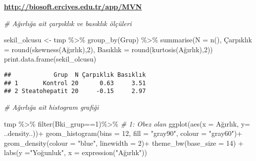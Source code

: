 \documentclass[
]{article}
\newenvironment{Shaded}{\begin{snugshade}}{\end{snugshade}}
\newcommand{\AttributeTok}[1]{\textcolor[rgb]{0.77,0.63,0.00}{#1}}
\newcommand{\CommentTok}[1]{\textcolor[rgb]{0.56,0.35,0.01}{\textit{#1}}}
\newcommand{\DecValTok}[1]{\textcolor[rgb]{0.00,0.00,0.81}{#1}}
\newcommand{\FunctionTok}[1]{\textcolor[rgb]{0.00,0.00,0.00}{#1}}
\newcommand{\NormalTok}[1]{#1}
\newcommand{\OtherTok}[1]{\textcolor[rgb]{0.56,0.35,0.01}{#1}}
\newcommand{\SpecialCharTok}[1]{\textcolor[rgb]{0.00,0.00,0.00}{#1}}
\newcommand{\StringTok}[1]{\textcolor[rgb]{0.31,0.60,0.02}{#1}}
\begin{document}
\textbf{\url{http://biosoft.erciyes.edu.tr/app/MVN}}

\begin{Shaded}
\begin{Highlighting}[]
\CommentTok{\# Ağırlığa ait çarpıklık ve basıklık ölçüleri}

\NormalTok{sekil\_olcusu }\OtherTok{\textless{}{-}}\NormalTok{ tmp }\SpecialCharTok{\%\textgreater{}\%}
  \FunctionTok{group\_by}\NormalTok{(Grup) }\SpecialCharTok{\%\textgreater{}\%}
  \FunctionTok{summarise}\NormalTok{(}\AttributeTok{N =} \FunctionTok{n}\NormalTok{(), Çarpıklık }\OtherTok{=} \FunctionTok{round}\NormalTok{(}\FunctionTok{skewness}\NormalTok{(Ağırlık),}\DecValTok{2}\NormalTok{), }
\NormalTok{                     Basıklık }\OtherTok{=} \FunctionTok{round}\NormalTok{(}\FunctionTok{kurtosis}\NormalTok{(Ağırlık),}\DecValTok{2}\NormalTok{))}
\FunctionTok{print.data.frame}\NormalTok{(sekil\_olcusu)}
\end{Highlighting}
\end{Shaded}

\begin{verbatim}
##            Grup  N Çarpıklık Basıklık
## 1       Kontrol 20      0.63     3.51
## 2 Steatohepatit 20     -0.15     2.97
\end{verbatim}

\begin{Shaded}
\begin{Highlighting}[]
\CommentTok{\# Ağırlığa ait histogram grafiği}

\NormalTok{tmp }\SpecialCharTok{\%\textgreater{}\%}
\FunctionTok{filter}\NormalTok{(Bki\_grup}\SpecialCharTok{==}\DecValTok{1}\NormalTok{)}\SpecialCharTok{\%\textgreater{}\%}     \CommentTok{\# 1: Obez olan}
\FunctionTok{ggplot}\NormalTok{(}\FunctionTok{aes}\NormalTok{(}\AttributeTok{x =}\NormalTok{ Ağırlık, }\AttributeTok{y=}\NormalTok{ ..density..))}\SpecialCharTok{+}
  \FunctionTok{geom\_histogram}\NormalTok{(}\AttributeTok{bins =} \DecValTok{12}\NormalTok{, }\AttributeTok{fill =} \StringTok{"gray90"}\NormalTok{, }\AttributeTok{colour =} \StringTok{"gray60"}\NormalTok{)}\SpecialCharTok{+}
  \FunctionTok{geom\_density}\NormalTok{(}\AttributeTok{colour =} \StringTok{"blue"}\NormalTok{, }\AttributeTok{linewidth =} \DecValTok{2}\NormalTok{)}\SpecialCharTok{+}
  \FunctionTok{theme\_bw}\NormalTok{(}\AttributeTok{base\_size =} \DecValTok{14}\NormalTok{) }\SpecialCharTok{+} 
    \FunctionTok{labs}\NormalTok{(}\AttributeTok{y =}\StringTok{"Yoğunluk"}\NormalTok{, }\AttributeTok{x =} \FunctionTok{expression}\NormalTok{(}\StringTok{"Ağırlık"}\NormalTok{))}
\end{Highlighting}
\end{Shaded}
\end{document}
